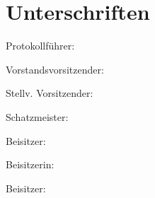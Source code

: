 \documentclass[a4paper,12pt]{scrartcl}
\begin{document}
\cleardoublepage
\section*{Unterschriften}
\vspace{0.7cm}
\noindent Protokollführer: \hrulefill\hfill\phantom{c}\par
\vspace{0.7cm}
\noindent Vorstandsvorsitzender: \hrulefill\hfill\phantom{c}\par
\vspace{0.7cm}
\noindent Stellv. Vorsitzender: \hrulefill\hfill\phantom{c}\par
\vspace{0.7cm}
\noindent Schatzmeister: \hrulefill\hfill\phantom{c}\par
\vspace{0.7cm}
\noindent Beisitzer: \hrulefill\hfill\phantom{c}\par
\vspace{0.7cm}
\noindent Beisitzerin: \hrulefill\hfill\phantom{c}\par
\vspace{0.7cm}
\noindent Beisitzer: \hrulefill\hfill\phantom{c}\par
\end{document}
